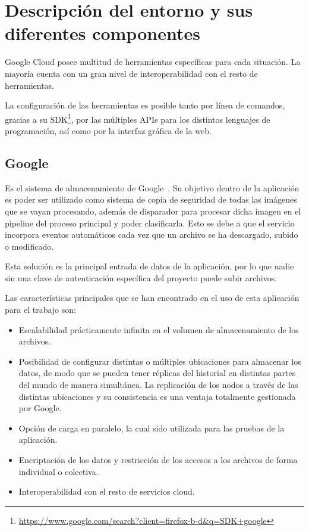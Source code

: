 \section{Descripción del entorno y sus diferentes componentes}\label{sec:descripción-del-entorno-y-sus-diferentes-componentes}
Google Cloud posee multitud de herramientas específicas para cada situación. La mayoría cuenta con un gran nivel de interoperabilidad con el resto de herramientas.

La configuración de las herramientas es posible tanto por línea de comandos, gracias a su SDK\footnote{\url{https://www.google.com/search?client=firefox-b-d&q=SDK+google}}, por las múltiples APIs para los distintos lenguajes de programación, así como por la interfaz gráfica de la web.

\subsection{Google }\label{subsec:storage}
Es el sistema de almacenamiento de Google~\cite{data_warehousing}.
Su objetivo dentro de la aplicación es poder ser utilizado como sistema de copia de seguridad de todas las imágenes que se vayan procesando, además de disparador para procesar dicha imagen en el pipeline del proceso principal y poder clasificarla.
Esto se debe a que el servicio incorpora eventos automáticos cada vez que un archivo se ha descargado, subido o modificado.

Esta solución es la principal entrada de datos de la aplicación, por lo que nadie sin una clave de autenticación específica del proyecto puede subir archivos.

Las características principales que se han encontrado en el uso de esta aplicación para el trabajo son:
\begin{itemize}
    \item Escalabilidad prácticamente infinita en el volumen de almacenamiento de los archivos.
    \item Posibilidad de configurar distintas o múltiples ubicaciones para almacenar los datos, de modo que se pueden tener réplicas del historial en distintas partes del mundo de manera simultánea.
    La replicación de los nodos a través de las distintas ubicaciones y su consistencia es una ventaja totalmente gestionada por Google.
    \item Opción de carga en paralelo, la cual sido utilizada para las pruebas de la aplicación.
    \item Encriptación de los datos y restricción de los accesos a los archivos de forma individual o colectiva.
    \item Interoperabilidad con el resto de servicios cloud.
\end{itemize}

